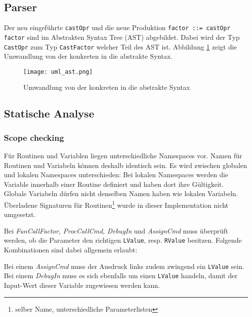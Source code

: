 \documentclass[10pt, a4paper, twocolumn]{article} %
\begin{document}
\subsection{Parser}
Der neu eingeführte \texttt{castOpr} und die neue Produktion \texttt{factor ::= castOpr factor} sind im Abstrakten Syntax Tree (AST) abgebildet.
Dabei wird der Typ \texttt{CastOpr} zum Typ \texttt{CastFactor} welcher Teil des AST ist.
Abbildung \ref{ast} zeigt die Umwandlung von der konkreten in die abstrakte Syntax.

\begin{figure}[H]
    \texttt{[image: uml\_ast.png]} %
    \caption{Umwandlung von der konkreten in die abstrakte Syntax} %
    \label{ast}
\end{figure}

\subsection{Statische Analyse}

\subsubsection*{Scope checking}
Für Routinen und Variablen liegen unterschiedliche Namespaces vor.
Namen für Routinen und Variabeln können deshalb identisch sein.
Es wird zwischen globalen und lokalen Namespaces unterschieden: Bei lokalen Namespaces werden die Variable innerhalb einer Routine definiert und haben dort ihre Gültigkeit.
Globale Variabeln dürfen nicht denselben Namen haben wie lokalen Variabeln.
Überladene Signaturen für Routinen\footnote{selber Name, unterschiedliche Parameterlisten} wurde in dieser Implementation nicht umgesetzt.

Bei \textit{FunCallFactor, ProcCallCmd, DebugIn} und \textit{AssignCmd} muss überprüft werden, ob die Parameter den richtigen \texttt{LValue}, resp. \texttt{RValue} besitzen.
Folgende Kombinationen sind dabei allgemein erlaubt:

\begin{table}[h]
    \centering
    \tiny
    \caption{LRValue-Kombinationen}
    \label{tab:lrvalues}
\end{table}
Bei einem \textit{AssignCmd} muss der Ausdruck links zudem zwingend ein \texttt{LValue} sein.
Bei einem \textit{DebugIn} muss es sich ebenfalls um einen \texttt{LValue} handeln, damit der Input-Wert dieser Variable zugewiesen werden kann.
\end{document}
